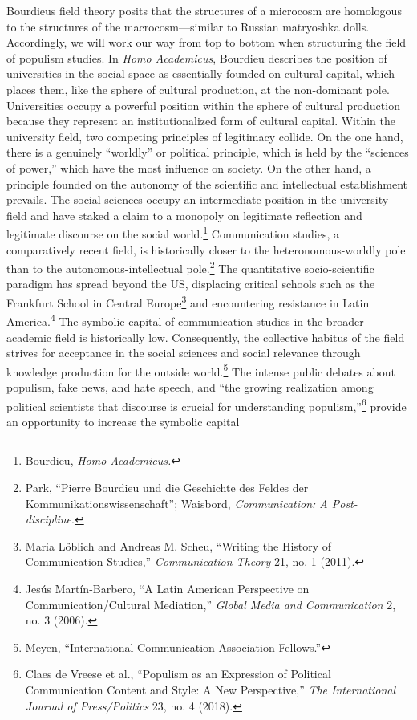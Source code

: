 \documentclass{tufte-handout}
\begin{document}
Bourdieu\textquotesingle s field theory posits that the structures of a
microcosm are homologous to the structures of the macrocosm---similar to
Russian matryoshka dolls. Accordingly, we will work our way from top to
bottom when structuring the field of populism studies. In \emph{Homo
Academicus}, Bourdieu describes the position of universities in the
social space as essentially founded on cultural capital, which places
them, like the sphere of cultural production, at the non-dominant pole.
Universities occupy a powerful position within the sphere of cultural
production because they represent an institutionalized form of cultural
capital. Within the university field, two competing principles of
legitimacy collide. On the one hand, there is a genuinely ``worldly'' or
political principle, which is held by the ``sciences of power,'' which
have the most influence on society. On the other hand, a principle
founded on the autonomy of the scientific and intellectual establishment
prevails. The social sciences occupy an intermediate position in the
university field and have staked a claim to a monopoly on legitimate
reflection and legitimate discourse on the social world.\footnote{Bourdieu,
  \emph{Homo Academicus.}} Communication studies, a comparatively recent
field, is historically closer to the heteronomous-worldly pole than to
the autonomous-intellectual pole.\footnote{Park, ``Pierre Bourdieu und
  die Geschichte des Feldes der Kommunikationswissenschaft''; Waisbord,
  \emph{Communication: A Post-discipline}.} The quantitative
socio-scientific paradigm has spread beyond the US, displacing critical
schools such as the Frankfurt School in Central Europe\footnote{Maria
  Löblich and Andreas M. Scheu, ``Writing the History of Communication
  Studies,'' \emph{Communication Theory} 21, no. 1 (2011).} and
encountering resistance in Latin America.\footnote{Jesús Martín-Barbero,
  ``A Latin American Perspective on Communication/Cultural Mediation,''
  \emph{Global Media and Communication} 2, no. 3 (2006).} The symbolic
capital of communication studies in the broader academic field is
historically low. Consequently, the collective habitus of the field
strives for acceptance in the social sciences and social relevance
through knowledge production for the outside world.\footnote{Meyen,
  ``International Communication Association Fellows.''} The intense
public debates about populism, fake news, and hate speech, and ``the
growing realization among political scientists that discourse is crucial
for understanding populism,''\footnote{Claes de Vreese et al., ``Populism
  as an Expression of Political Communication Content and Style: A New
  Perspective,'' \emph{The International Journal of Press/Politics} 23,
  no. 4 (2018).} provide an opportunity to increase the symbolic capital
\end{document}
